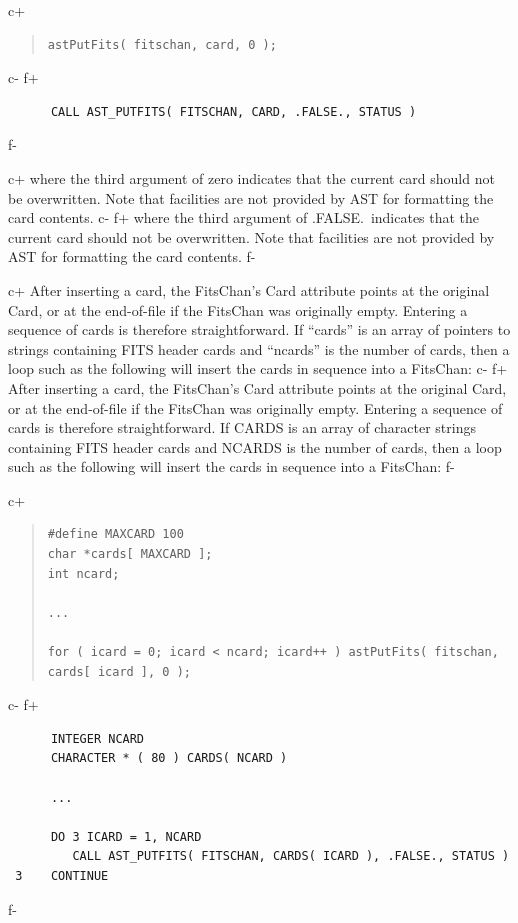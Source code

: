 \documentclass[twoside,11pt]{article}
\begin{document}
c+
\begin{quote}
\small
\begin{verbatim}
astPutFits( fitschan, card, 0 );
\end{verbatim}
\normalsize
\end{quote}
c-
f+
\small
\begin{verbatim}
      CALL AST_PUTFITS( FITSCHAN, CARD, .FALSE., STATUS )
\end{verbatim}
\normalsize
f-

c+
where the third argument of zero indicates that the current card
should not be overwritten. Note that facilities are not provided by
AST for formatting the card contents.
c-
f+
where the third argument of .FALSE.\ indicates that the current card
should not be overwritten. Note that facilities are not provided by
AST for formatting the card contents.
f-

c+
After inserting a card, the FitsChan's Card attribute points at the
original Card, or at the end-of-file if the FitsChan was originally
empty. Entering a sequence of cards is therefore straightforward. If
``cards'' is an array of pointers to strings containing FITS header
cards and ``ncards'' is the number of cards, then a loop such as the
following will insert the cards in sequence into a FitsChan:
c-
f+
After inserting a card, the FitsChan's Card attribute points at the
original Card, or at the end-of-file if the FitsChan was originally
empty. Entering a sequence of cards is therefore straightforward. If
CARDS is an array of character strings containing FITS header cards
and NCARDS is the number of cards, then a loop such as the following
will insert the cards in sequence into a FitsChan:
f-

c+
\begin{quote}
\small
\begin{verbatim}
#define MAXCARD 100
char *cards[ MAXCARD ];
int ncard;

...

for ( icard = 0; icard < ncard; icard++ ) astPutFits( fitschan, cards[ icard ], 0 );
\end{verbatim}
\normalsize
\end{quote}
c-
f+
\small
\begin{verbatim}
      INTEGER NCARD
      CHARACTER * ( 80 ) CARDS( NCARD )

      ...

      DO 3 ICARD = 1, NCARD
         CALL AST_PUTFITS( FITSCHAN, CARDS( ICARD ), .FALSE., STATUS )
 3    CONTINUE
\end{verbatim}
\normalsize
f-
\end{document}

